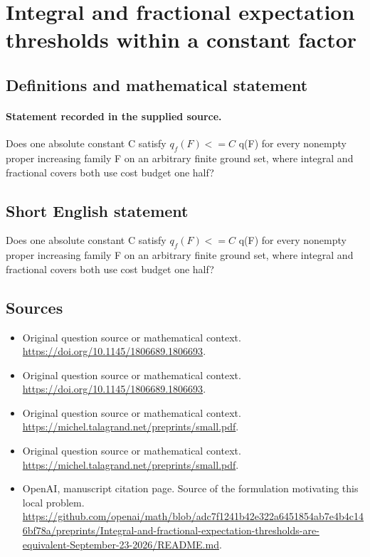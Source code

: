 \documentclass[11pt]{article}
\begin{document}
\section*{Integral and fractional expectation thresholds within a constant factor}\label{statement}
\subsection{Definitions and mathematical statement}
\paragraph{Statement recorded in the supplied source.}
Does one absolute constant C satisfy $q_f(F)<=C$ q(F) for every nonempty proper increasing family F on an arbitrary finite ground set, where integral and fractional covers both use cost budget one half?
\subsection{Short English statement}
Does one absolute constant C satisfy $q_f(F)<=C$ q(F) for every nonempty proper increasing family F on an arbitrary finite ground set, where integral and fractional covers both use cost budget one half?
\subsection{Sources}
\begin{itemize}
\item[S1] Original question source or mathematical context.
\url{https://doi.org/10.1145/1806689.1806693}.
\item[S2] Original question source or mathematical context.
\url{https://doi.org/10.1145/1806689.1806693}.
\item[S3] Original question source or mathematical context.
\url{https://michel.talagrand.net/preprints/small.pdf}.
\item[S4] Original question source or mathematical context.
\url{https://michel.talagrand.net/preprints/small.pdf}.
\item[S5] OpenAI, manuscript citation page. Source of the formulation motivating this local problem.
\url{https://github.com/openai/math/blob/adc7f1241b42e322a6451854ab7e4b4c146bf78a/preprints/Integral-and-fractional-expectation-thresholds-are-equivalent-September-23-2026/README.md}.
\end{itemize}
\end{document}
